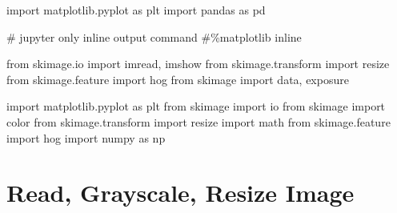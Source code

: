 \documentclass[
  letterpaper,
  DIV=11,
  numbers=noendperiod]{scrreprt}
\newenvironment{Shaded}{\begin{snugshade}}{\end{snugshade}}
\newcommand{\CommentTok}[1]{\textcolor[rgb]{0.37,0.37,0.37}{#1}}
\newcommand{\ImportTok}[1]{\textcolor[rgb]{0.00,0.46,0.62}{#1}}
\newcommand{\NormalTok}[1]{\textcolor[rgb]{0.00,0.23,0.31}{#1}}
\begin{document}
\begin{Shaded}
\begin{Highlighting}[]

\ImportTok{import}\NormalTok{ matplotlib.pyplot }\ImportTok{as}\NormalTok{ plt}
\ImportTok{import}\NormalTok{ pandas }\ImportTok{as}\NormalTok{ pd}

\CommentTok{\# jupyter only inline output command}
\CommentTok{\#\%matplotlib inline}

\ImportTok{from}\NormalTok{ skimage.io }\ImportTok{import}\NormalTok{ imread, imshow}
\ImportTok{from}\NormalTok{ skimage.transform }\ImportTok{import}\NormalTok{ resize}
\ImportTok{from}\NormalTok{ skimage.feature }\ImportTok{import}\NormalTok{ hog}
\ImportTok{from}\NormalTok{ skimage }\ImportTok{import}\NormalTok{ data, exposure}


\ImportTok{import}\NormalTok{ matplotlib.pyplot }\ImportTok{as}\NormalTok{ plt}
\ImportTok{from}\NormalTok{ skimage }\ImportTok{import}\NormalTok{ io}
\ImportTok{from}\NormalTok{ skimage }\ImportTok{import}\NormalTok{ color}
\ImportTok{from}\NormalTok{ skimage.transform }\ImportTok{import}\NormalTok{ resize}
\ImportTok{import}\NormalTok{ math}
\ImportTok{from}\NormalTok{ skimage.feature }\ImportTok{import}\NormalTok{ hog}
\ImportTok{import}\NormalTok{ numpy }\ImportTok{as}\NormalTok{ np}
\end{Highlighting}
\end{Shaded}

\hypertarget{read-grayscale-resize-image}{%
\section{Read, Grayscale, Resize
Image}\label{read-grayscale-resize-image}}
\end{document}
